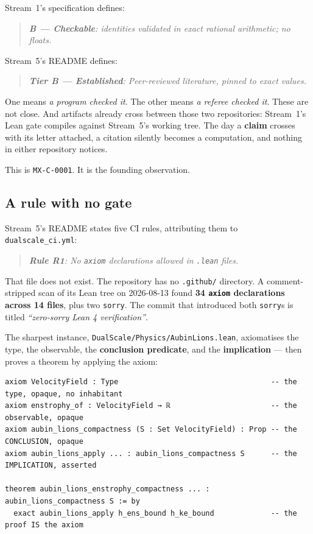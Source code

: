 \documentclass[11pt,a4paper]{article}
\begin{document}
Stream~1's specification defines:

\begin{quote}\itshape
\textbf{B — Checkable}: identities validated in exact rational arithmetic; no floats.
\end{quote}

Stream~5's README defines:

\begin{quote}\itshape
\textbf{Tier B — Established}: Peer-reviewed literature, pinned to exact values.
\end{quote}

One means \emph{a program checked it}. The other means \emph{a referee checked it}. These are
not close. And artifacts already cross between those two repositories: Stream~1's Lean gate
compiles against Stream~5's working tree. The day a \textbf{claim} crosses with its letter
attached, a citation silently becomes a computation, and nothing in either repository notices.

This is \texttt{MX-C-0001}. It is the founding observation.

\subsection{A rule with no gate}

Stream~5's README states five CI rules, attributing them to \texttt{dualscale_ci.yml}:

\begin{quote}\itshape
\textbf{Rule R1}: No \texttt{axiom} declarations allowed in \texttt{.lean} files.
\end{quote}

That file does not exist. The repository has no \texttt{.github/} directory. A comment-stripped
scan of its Lean tree on 2026-08-13 found \textbf{34 \texttt{axiom} declarations across 14
files}, plus two \texttt{sorry}. The commit that introduced both \texttt{sorry}s is titled
\emph{``zero-sorry Lean 4 verification''}.

The sharpest instance, \texttt{DualScale/Physics/AubinLions.lean}, axiomatises the type, the
observable, the \textbf{conclusion predicate}, and the \textbf{implication} — then proves a
theorem by applying the axiom:

\begin{lstlisting}[language=Lean]
axiom VelocityField : Type                                   -- the type, opaque, no inhabitant
axiom enstrophy_of : VelocityField → ℝ                       -- the observable, opaque
axiom aubin_lions_compactness (S : Set VelocityField) : Prop -- the CONCLUSION, opaque
axiom aubin_lions_apply ... : aubin_lions_compactness S      -- the IMPLICATION, asserted

theorem aubin_lions_enstrophy_compactness ... : aubin_lions_compactness S := by
  exact aubin_lions_apply h_ens_bound h_ke_bound             -- the proof IS the axiom
\end{lstlisting}
\end{document}
